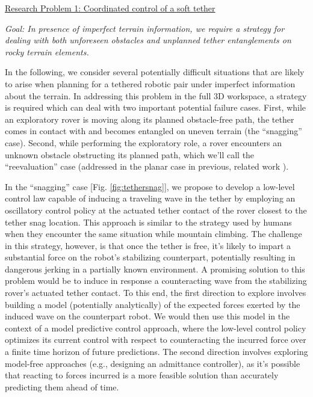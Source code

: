 \documentclass[12pt]{article}
\begin{document}

\noindent\underline{Research Problem 1: Coordinated control of a soft tether}

{\sl Goal: In presence of imperfect terrain information, we require a
  strategy for dealing with both unforeseen obstacles and unplanned
  tether entanglements on rocky terrain elements. }


In the following, we consider several potentially difficult situations
that are likely to arise when planning for a tethered robotic pair
under imperfect information about the terrain. In addressing this
problem in the full 3D workspace, a strategy is required which can
deal with two important potential failure cases. First, while an
exploratory rover is moving along its planned obstacle-free path, the
tether comes in contact with and becomes entangled on uneven terrain
(the ``snagging'' case). Second, while performing the exploratory
role, a rover encounters an unknown obstacle obstructing its planned
path, which we'll call the ``reevaluation'' case (addressed in the
planar case in previous, related work \cite{axel_online}).


In the ``snagging'' case [Fig. \ref{fig:tethersnag}], we propose to
develop a low-level control law capable of inducing a traveling wave
in the tether by employing an oscillatory control policy at the
actuated tether contact of the rover closest to the tether snag
location. This approach is similar to the strategy used by humans when
they encounter the same situation while mountain climbing.  The
challenge in this strategy, however, is that once the tether is free,
it's likely to impart a substantial force on the robot's stabilizing
counterpart, potentially resulting in dangerous jerking in a partially
known environment.  A promising solution to this problem would be to
induce in response a counteracting wave from the stabilizing rover's
actuated tether contact. To this end, the first direction to explore
involves building a model (potentially analytically) of the expected
forces exerted by the induced wave on the counterpart robot.  We would
then use this model in the context of a model predictive control
approach, where the low-level control policy optimizes its current
control with respect to counteracting the incurred force over a finite
time horizon of future predictions. The second direction involves
exploring model-free approaches (e.g., designing an admittance
controller), as it's possible that reacting to forces incurred is a
more feasible solution than accurately predicting them ahead of time.
\end{document}

